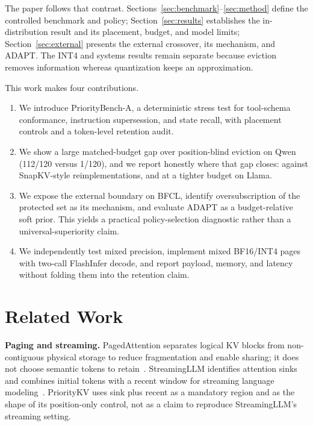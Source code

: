 The paper follows that contrast.  Sections~\ref{sec:benchmark}--\ref{sec:method}
define the controlled benchmark and policy; Section~\ref{sec:results} establishes
the in-distribution result and its placement, budget, and model limits;
Section~\ref{sec:external} presents the external crossover, its mechanism, and
ADAPT.  The INT4 and systems results remain separate because eviction removes
information whereas quantization keeps an approximation.

This work makes four contributions.
\begin{enumerate}
  \item We introduce PriorityBench-A, a deterministic stress test for
  tool-schema conformance, instruction supersession, and state recall, with
  placement controls and a token-level retention audit.
  \item We show a large matched-budget gap over position-blind eviction on
  Qwen (112/120 versus 1/120), and we report honestly where that gap closes:
  against SnapKV-style reimplementations, and at a tighter budget on Llama.
  \item We expose the external boundary on BFCL, identify oversubscription of the
  protected set as its mechanism, and evaluate ADAPT as a budget-relative soft
  prior.  This yields a practical policy-selection diagnostic rather than a
  universal-superiority claim.
  \item We independently test mixed precision, implement mixed BF16/INT4 pages
  with two-call FlashInfer decode, and report payload, memory, and latency without
  folding them into the retention claim.
\end{enumerate}

\section{Related Work}
\label{sec:related}

\textbf{Paging and streaming.}
PagedAttention separates logical KV blocks from non-contiguous physical storage
to reduce fragmentation and enable sharing; it does not choose semantic tokens
to retain~\cite{kwon2023pagedattention}.  StreamingLLM identifies attention
sinks and combines initial tokens with a recent window for streaming language
modeling~\cite{xiao2024streamingllm}.  PriorityKV uses sink plus recent as a
mandatory region and as the shape of its position-only control, not as a claim
to reproduce StreamingLLM's streaming setting.

